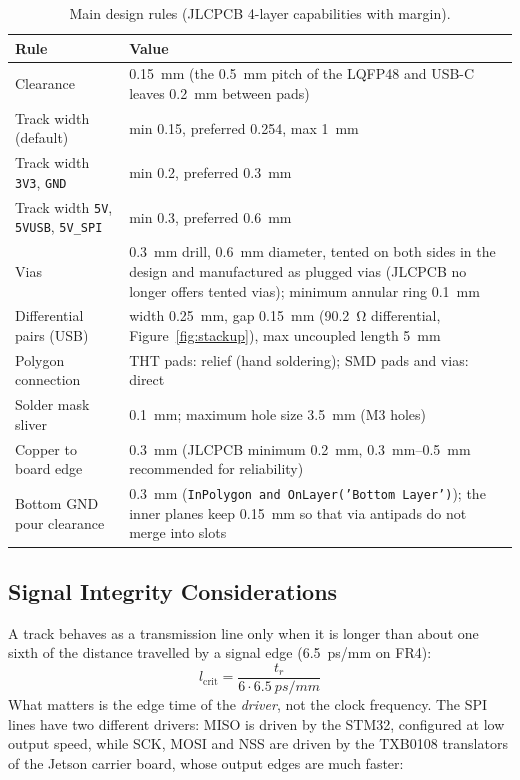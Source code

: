 \documentclass[11pt,a4paper]{article}
\newcommand{\net}[1]{\texttt{#1}}
\begin{document}
\begin{table}[H]
\centering
\begin{tabular}{l>{\raggedright\arraybackslash}p{}}
\toprule
Rule & Value \\
\midrule
Clearance & \qty{0.15}{mm} (the \qty{0.5}{mm} pitch of the LQFP48 and USB-C leaves \qty{0.2}{mm} between pads) \\
Track width (default) & min 0.15, preferred 0.254, max \qty{1}{mm} \\
Track width \net{3V3}, \net{GND} & min 0.2, preferred \qty{0.3}{mm} \\
Track width \net{5V}, \net{5VUSB}, \net{5V\_SPI} & min 0.3, preferred \qty{0.6}{mm} \\
Vias & \qty{0.3}{mm} drill, \qty{0.6}{mm} diameter, tented on both sides in the design and manufactured
as plugged vias (JLCPCB no longer offers tented vias); minimum annular ring \qty{0.1}{mm} \\
Differential pairs (USB) & width \qty{0.25}{mm}, gap \qty{0.15}{mm} (\qty{90.2}{\ohm} differential, Figure~\ref{fig:stackup}),
max uncoupled length \qty{5}{mm} \\
Polygon connection & THT pads: relief (hand soldering); SMD pads and vias: direct \\
Solder mask sliver & \qty{0.1}{mm}; maximum hole size \qty{3.5}{mm} (M3 holes) \\
Copper to board edge & \qty{0.3}{mm} (JLCPCB minimum \qty{0.2}{mm}, \qtyrange{0.3}{0.5}{mm} recommended for reliability) \\
Bottom GND pour clearance & \qty{0.3}{mm} (\texttt{InPolygon and OnLayer('Bottom Layer')}); the inner planes keep
\qty{0.15}{mm} so that via antipads do not merge into slots \\
\bottomrule
\end{tabular}
\caption{Main design rules (JLCPCB 4-layer capabilities with margin).}
\label{tab:rules}
\end{table}

\subsection{Signal Integrity Considerations}\label{sec:si}

A track behaves as a transmission line only when it is longer than about one sixth of the distance
travelled by a signal edge (\qty{6.5}{ps/mm} on FR4):
\begin{equation}
l_\text{crit} = \frac{t_r}{6 \cdot \qty{6.5}{ps/mm}}
\end{equation}
What matters is the edge time of the \textit{driver}, not the clock frequency. The SPI lines have two
different drivers: MISO is driven by the STM32, configured at low output speed, while SCK,
MOSI and NSS are driven by the TXB0108 translators of the Jetson carrier board, whose output
edges are much faster:
\end{document}
